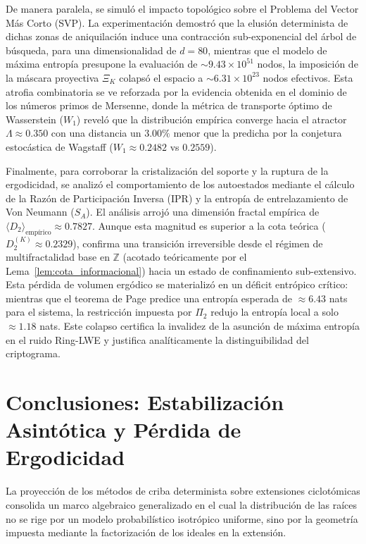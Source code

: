 \documentclass{article}
\numberwithin{equation}{section}
\theoremstyle{plain}
\theoremstyle{definition}
\begin{document}
De manera paralela, se simuló el impacto topológico sobre el Problema del Vector Más Corto (SVP). La experimentación demostró que la elusión determinista de dichas zonas de aniquilación induce una contracción sub-exponencial del árbol de búsqueda, para una dimensionalidad de $d=80$, mientras que el modelo de máxima entropía presupone la evaluación de $\sim 9.43 \times 10^{51}$ nodos, la imposición de la máscara proyectiva $\Xi_K$ colapsó el espacio a $\sim 6.31 \times 10^{23}$ nodos efectivos. Esta atrofia combinatoria se ve reforzada por la evidencia obtenida en el dominio de los números primos de Mersenne, donde la métrica de transporte óptimo de Wasserstein ($W_1$) reveló que la distribución empírica converge hacia el atractor $\Lambda \approx 0.350$ con una distancia un $3.00\%$ menor que la predicha por la conjetura estocástica de Wagstaff ($W_1 \approx 0.2482$ vs $0.2559$).

Finalmente, para corroborar la cristalización del soporte y la ruptura de la ergodicidad, se analizó el comportamiento de los autoestados mediante el cálculo de la Razón de Participación Inversa (IPR) y la entropía de entrelazamiento de Von Neumann ($S_A$). El análisis arrojó una dimensión fractal empírica de $\langle D_2 \rangle_{\text{empírico}} \approx 0.7827$. Aunque esta magnitud es superior a la cota teórica ($D_2^{(K)} \approx 0.2329$), confirma una transición irreversible desde el régimen de multifractalidad base en $\mathbb{Z}$ (acotado teóricamente por el Lema~\ref{lem:cota_informacional}) hacia un estado de confinamiento sub-extensivo. Esta pérdida de volumen ergódico se materializó en un déficit entrópico crítico: mientras que el teorema de Page predice una entropía esperada de $\approx 6.43$ nats para el sistema, la restricción impuesta por $\Pi_2$ redujo la entropía local a solo $\approx 1.18$ nats. Este colapso certifica la invalidez de la asunción de máxima entropía en el ruido Ring-LWE y justifica analíticamente la distinguibilidad del criptograma.

\section{Conclusiones: Estabilización Asintótica y Pérdida de Ergodicidad}
\label{sec:discusion_conclusiones}

La proyección de los métodos de criba determinista sobre extensiones ciclotómicas consolida un marco algebraico generalizado en el cual la distribución de las raíces no se rige por un modelo probabilístico isotrópico uniforme, sino por la geometría impuesta mediante la factorización de los ideales en la extensión.
\end{document}
